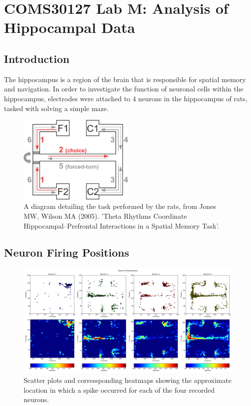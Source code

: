 \documentclass[a4paper, 10pt]{article}
\begin{document}
\section*{COMS30127 Lab M: Analysis of Hippocampal Data}

\subsection*{Introduction}
The hippocampus is a region of the brain that is responsible for spatial memory and navigation. In order to investigate the function of neuronal cells within the hippocampus, electrodes were attached to 4 neurons in the hippocampus of rats, tasked with solving a simple maze. 

\begin{figure}[H]
  \centering
  \includegraphics[width=0.5\textwidth]{rat_maze.png}
  \caption{A diagram detailing the task performed by the rats, from Jones MW, Wilson MA (2005). 'Theta Rhythms Coordinate Hippocampal–Prefrontal Interactions in a Spatial Memory Task'.}
  \label{fig:maze}
\end{figure}

\subsection*{Neuron Firing Positions}
\begin{figure}[H]
  \centering
  \includegraphics[width=1.0\textwidth]{neuron_pos_plot.png}
  \caption{Scatter plots and corressponding heatmaps showing the approximate location in which a spike occurred for each of the four recorded neurons.}
  \label{fig:posplot}
\end{figure}
\end{document}
